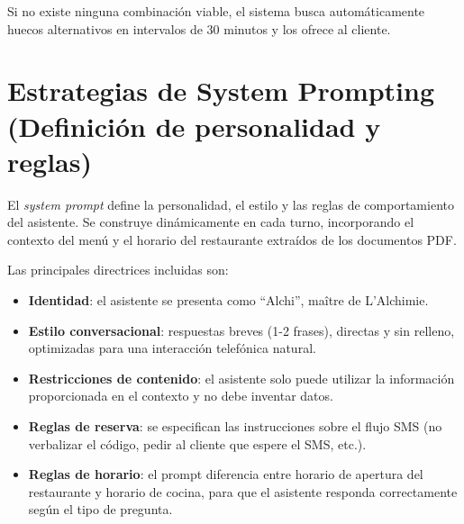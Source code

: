 Si no existe ninguna combinación viable, el sistema busca automáticamente huecos alternativos en intervalos de 30 minutos y los ofrece al cliente.

\section{Estrategias de System Prompting (Definición de personalidad y reglas)}
\label{sec:system_prompting}

El \textit{system prompt} define la personalidad, el estilo y las reglas de comportamiento del asistente. Se construye dinámicamente en cada turno, incorporando el contexto del menú y el horario del restaurante extraídos de los documentos PDF.

Las principales directrices incluidas son:

\begin{itemize}
    \item \textbf{Identidad}: el asistente se presenta como ``Alchi'', maître de L'Alchimie.
    \item \textbf{Estilo conversacional}: respuestas breves (1-2 frases), directas y sin relleno, optimizadas para una interacción telefónica natural.
    \item \textbf{Restricciones de contenido}: el asistente solo puede utilizar la información proporcionada en el contexto y no debe inventar datos.
    \item \textbf{Reglas de reserva}: se especifican las instrucciones sobre el flujo SMS (no verbalizar el código, pedir al cliente que espere el SMS, etc.).
    \item \textbf{Reglas de horario}: el prompt diferencia entre horario de apertura del restaurante y horario de cocina, para que el asistente responda correctamente según el tipo de pregunta.
\end{itemize}
